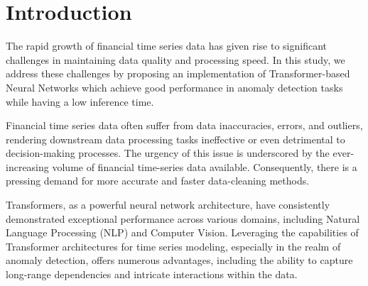 \documentclass[a4paper, twoside]{report}
\theoremstyle{definition}
\numberwithin{equation}{section}
\begin{document}


\chapter*{Introduction}



The rapid growth of financial time series data has given rise to significant
challenges in maintaining data quality and processing speed. In this study, we address
these challenges by proposing an implementation of Transformer-based Neural Networks
which achieve good performance in anomaly detection tasks while having
a low inference time.

Financial time series data often suffer from data inaccuracies, errors, and
outliers, rendering downstream data processing tasks ineffective or even detrimental to
decision-making processes. The urgency of this issue is underscored by the ever-increasing
volume of financial time-series data available. Consequently, there is a pressing
demand for more accurate and faster data-cleaning methods.

Transformers, as a powerful neural network architecture, have consistently
demonstrated exceptional performance across various domains, including Natural Language
Processing (NLP) and Computer Vision. Leveraging the capabilities of Transformer
architectures for time series modeling, especially in the realm of anomaly detection, offers
numerous advantages, including the ability to capture long-range dependencies and
intricate interactions within the data.
\end{document}
